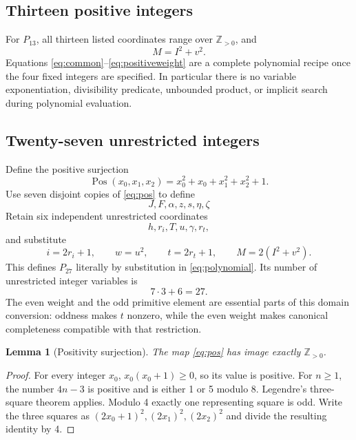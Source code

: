 \documentclass[11pt]{article}
\newtheorem{lemma}[theorem]{Lemma}
\theoremstyle{definition}\newtheorem{definition}[theorem]{Definition}
\theoremstyle{remark}\newtheorem{remark}[theorem]{Remark}
\newcommand{\Z}{\mathbb Z}\newcommand{\N}{\mathbb N}
\newcommand{\Pos}{\operatorname{Pos}}\newcommand{\Con}{\operatorname{Con}}
\begin{document}
\subsection{Thirteen positive integers}
For $P_{13}$, all thirteen listed coordinates range over $\Z_{>0}$, and
\begin{equation}
\boxed{M=I^2+v^2.}\label{eq:positiveweight}
\end{equation}
Equations \eqref{eq:common}--\eqref{eq:positiveweight} are a complete polynomial recipe once the four fixed integers are specified. In particular there is no variable exponentiation, divisibility predicate, unbounded product, or implicit search during polynomial evaluation.

\subsection{Twenty-seven unrestricted integers}
Define the positive surjection
\begin{equation}
\Pos(x_0,x_1,x_2)=x_0^2+x_0+x_1^2+x_2^2+1.\label{eq:pos}
\end{equation}
Use seven disjoint copies of \eqref{eq:pos} to define
\begin{equation}
J,F,\alpha,z,s,\eta,\zeta\label{eq:seven}
\end{equation}
Retain six independent unrestricted coordinates
\[
h,r_i,T,u,\gamma,r_t,
\]
and substitute
\begin{equation}
i=2r_i+1,\qquad w=u^2,\qquad t=2r_t+1,\qquad
\boxed{M=2(I^2+v^2).}\label{eq:integerweight}
\end{equation}
This defines $P_{27}$ literally by substitution in \eqref{eq:polynomial}. Its number of unrestricted integer variables is
\[
7\cdot3+6=27.
\]
The even weight and the odd primitive element are essential parts of this domain conversion: oddness makes $t$ nonzero, while the even weight makes canonical completeness compatible with that restriction.

\begin{lemma}[Positivity surjection]
The map \eqref{eq:pos} has image exactly $\Z_{>0}$.
\end{lemma}
\begin{proof}
For every integer $x_0$, $x_0(x_0+1)\ge0$, so its value is positive. For $n\ge1$, the number $4n-3$ is positive and is either 1 or 5 modulo 8. Legendre's three-square theorem applies. Modulo 4 exactly one representing square is odd. Write the three squares as $(2x_0+1)^2,(2x_1)^2,(2x_2)^2$ and divide the resulting identity by 4.
\end{proof}
\end{document}
